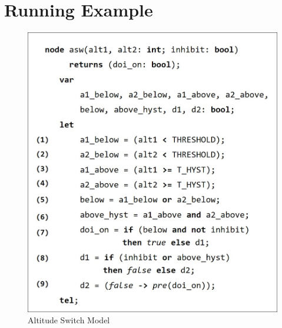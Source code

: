 \section{Running Example}
\label{sec:example}


\begin{figure}[t]
\centering
\includegraphics[width=0.9\columnwidth]{figs/code.jpg}
\vspace{-0.1in}
\caption{Altitude Switch Model}
\vspace{-0.27in}
\label{fig:asw}
\end{figure}

